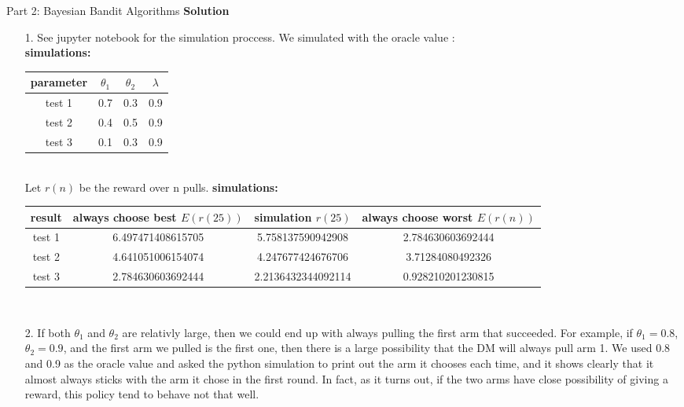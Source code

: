 \documentclass{article}
\newcommand{\solution}{\textbf{\Large Solution}}
\begin{document}
\begin{homeworkProblem}{Part 2: Bayesian Bandit Algorithms}
    \solution
    \begin{enumerate}
        \item[1.]
        See jupyter notebook for the simulation proccess. We simulated with the oracle value :\\
        \textbf{simulations:}\\
        \begin{tabular}[t]{|c|c|c|c|}
        \hline
        parameter & $\theta_1$ & $\theta_2$ & $\lambda$ \\
        \hline
        test 1 & 0.7 & 0.3 & 0.9 \\
        \hline
        test 2 & 0.4 & 0.5 & 0.9 \\
        \hline
        test 3 & 0.1 & 0.3 & 0.9 \\
        \hline
        \end{tabular}\\
        Let $r(n)$ be the reward over n pulls.
        \textbf{simulations:}\\
        \begin{tabular}[t]{|c|c|c|c|}
        \hline
        result & always choose best $E(r(25))$ & simulation $r(25)$ & always choose worst $E(r(n))$ \\
        \hline
        test 1 & 6.497471408615705 & 5.758137590942908 & 2.784630603692444 \\
        \hline
        test 2 & 4.641051006154074 & 4.247677424676706 & 3.71284080492326 \\
        \hline
        test 3 & 2.784630603692444 & 2.2136432344092114 & 0.928210201230815 \\
        \hline
        \end{tabular}\\
        \item[2.]
        If both $\theta_1$ and $\theta_2$ are relativly large, then we could end up with always pulling the first arm that succeeded.
        For example, if $\theta_1 = 0.8$, $\theta_2 = 0.9$, and the first arm we pulled is the first one, then there is a large possibility that the DM will always pull arm 1.
        We used 0.8 and 0.9 as the oracle value and asked the python simulation to print out the arm it chooses each time, and it shows clearly that it almost always sticks with the arm it chose in the first round.
        In fact, as it turns out, if the two arms have close possibility of giving a reward, this policy tend to behave not that well.

\end{enumerate}
\end{homeworkProblem}
\end{document}
